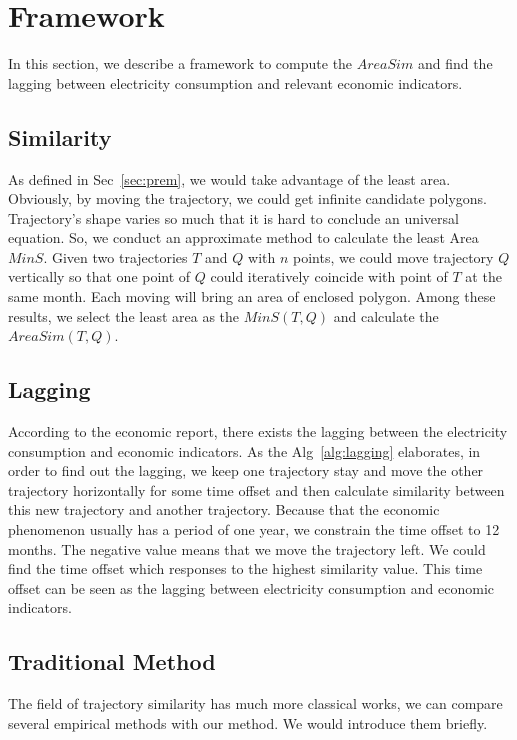 

%
\section{Framework} \label{sec:alg}
In this section, we describe a framework to compute the $AreaSim$ and  find the lagging between electricity consumption and relevant economic indicators.

\subsection{Similarity}
As defined in Sec~\ref{sec:prem}, we would take advantage of the least area. Obviously, by moving the trajectory, we could get infinite candidate polygons. Trajectory's shape varies so much that it is hard to conclude an universal equation. So, we conduct an approximate method to calculate the least Area $MinS$. Given two trajectories $T$ and $Q$ with $n$ points, we could move trajectory $Q$ vertically so that one point of $Q$ could iteratively coincide with point of $T$ at the same month. Each moving will bring an area of enclosed polygon. Among these results, we select the least area as the $MinS(T, Q)$ and calculate the $AreaSim(T, Q)$.  

\subsection{Lagging}
According to the economic report, there exists the lagging between the electricity consumption and economic indicators. As the Alg~\ref{alg:lagging} elaborates, in order to find out the lagging, we keep one trajectory stay and move the other trajectory horizontally for some time offset and then calculate similarity between this new trajectory and another trajectory. Because that the economic phenomenon usually has a period of one year, we constrain the time offset to 12 months. The negative value means that we move the trajectory left. We could find the time offset which responses to the highest similarity value. This time offset can be seen as the lagging between electricity consumption and economic indicators.

\subsection{Traditional Method}
The field of trajectory similarity has much more classical works, we can compare several empirical methods with our method. We would introduce them briefly. 


